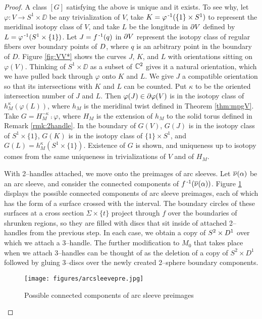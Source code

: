 \begin{proof}
	A class $[G]$ satisfying the above is unique and it exists.
	To see why, let $\varphi:V\to S^1\times\DD$ be any trivialization of $V$, take $K=\varphi^{\,\text{-}1}(\{1\}\times S^1)$ to represent the meridinal isotopy class of $V$, and take $L$ be the longitude in $\partial V$ defined by $L=\varphi^{\,\text{-}1}(S^1\times\{1\})$.
	Let $J=f^{\,\text{-}1}(q)$ in $\partial V$ represent the isotopy class of regular fibers over boundary points of $D$, where $q$ is an arbitrary point in the boundary of $D$.	
	Figure \ref{fig:VV*} shows the curves $J$, $K$, and $L$ with orientations sitting on $\varphi(V)$.
	Thinking of $S^1\times\DD$ as a subset of $\mathbb{C}^2$ gives it a natural orientation, which we have pulled back through $\varphi$ onto $K$ and $L$.
	We give $J$ a compatible orientation so that its intersections with $K$ and $L$ can be counted.
	Put $\kappa$ to be the oriented intersection number of $J$ and $L$.
	Then $\varphi(J)\in \partial\varphi(V)$ is in the isotopy class of $h_M^{\kappa}(\varphi(L))$, where $h_M$ is the meridinal twist defined in Theorem \ref{thm:mpgV}.
	Take $G=H_M^{-\kappa}\comp\varphi$, where $H_M$ is the extension of $h_M$ to the solid torus defined in Remark \ref{rmk:2handle}.
	In the boundary of $G(V)$, $G(J)$ is in the isotopy class of $S^1\times\{1\}$, $G(K)$ is in the isotopy class of $\{1\}\times S^1$, and $G(L)=h_M^\kappa(S^1\times\{1\})$.
	Existence of $G$ is shown, and uniqueness up to isotopy comes from the same uniqueness in trivializations of $V$ and of $H_M$.
		
	With 2--handles attached, we move onto the preimages of arc sleeves.
	Let $\overline{\nu}(\alpha)$ be an arc sleeve, and consider the connected components of $f^{\,\text{-}1}(\overline{\nu}(\alpha))$.
	Figure \ref{fig:arcsleevepre} displays the possible connected components of arc sleeve preimages, each of which has the form of a surface crossed with the interval.
	The boundary circles of these surfaces at a cross section $\Sigma\times\{t\}$ project through $f$ over the boundaries of shrunken regions, so they are filled with discs that sit inside of attached 2--handles from the previous step.
	In each case, we obtain a copy of $S^2\times D^1$ over which we attach a 3--handle.
	The further modification to $M_0$ that takes place when we attach 3--handles can be thought of as the deletion of a copy of $S^2\times D^1$ followed by gluing 3--discs over the newly created 2--sphere boundary components.
	
	\begin{figure}
		\centering
		\captionsetup{justification=centering}
		\caption{Possible connected components of arc sleeve preimages}
		\texttt{[image: figures/arcsleevepre.jpg]}
		\label{fig:arcsleevepre}
	\end{figure}
	

\end{proof}
